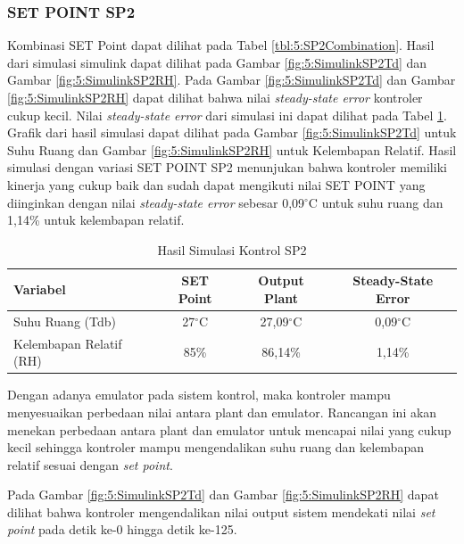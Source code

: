 \subsubsection{SET POINT SP2}

Kombinasi SET Point dapat dilihat pada Tabel \ref{tbl:5:SP2Combination}. Hasil dari simulasi simulink dapat dilihat pada Gambar \ref{fig:5:SimulinkSP2Td} dan Gambar \ref{fig:5:SimulinkSP2RH}. Pada Gambar \ref{fig:5:SimulinkSP2Td} dan Gambar \ref{fig:5:SimulinkSP2RH} dapat dilihat bahwa nilai \textit{steady-state error} kontroler cukup kecil. Nilai \textit{steady-state error} dari simulasi ini dapat dilihat pada Tabel \ref{tbl:5:SP2Ess}. Grafik dari hasil simulasi dapat dilihat pada Gambar \ref{fig:5:SimulinkSP2Td} untuk Suhu Ruang dan Gambar \ref{fig:5:SimulinkSP2RH} untuk Kelembapan Relatif. Hasil simulasi dengan variasi SET POINT SP2 menunjukan bahwa kontroler memiliki kinerja yang cukup baik dan sudah dapat mengikuti nilai SET POINT yang diinginkan dengan nilai \textit{steady-state error} sebesar 0,09$^\circ$C untuk suhu ruang dan 1,14\% untuk kelembapan relatif. \\ 

\begin{table}[!h]
	\caption{Hasil Simulasi Kontrol SP2}
	\label{tbl:5:SP2Ess}
	\centering
	\begin{tabular}{|l|c|c|c|}
		\hline
		\textbf{Variabel} & \textbf{SET Point} & \textbf{Output Plant} & \textbf{Steady-State Error}\\ \hline
		Suhu Ruang (Tdb) & 27$^\circ$C & 27,09$^\circ$C & 0,09$^\circ$C \\ \hline
		Kelembapan Relatif (RH) & 85\% & 86,14\% & 1,14\% \\ \hline
	\end{tabular}
\end{table}

Dengan adanya emulator pada sistem kontrol, maka kontroler mampu menyesuaikan perbedaan nilai antara plant dan emulator. Rancangan ini akan menekan perbedaan antara plant dan emulator untuk mencapai nilai yang cukup kecil sehingga kontroler mampu mengendalikan suhu ruang dan kelembapan relatif sesuai dengan \textit{set point}.

Pada Gambar \ref{fig:5:SimulinkSP2Td} dan Gambar \ref{fig:5:SimulinkSP2RH} dapat dilihat bahwa kontroler mengendalikan nilai output sistem mendekati nilai \textit{set point} pada detik ke-0 hingga detik ke-125.

